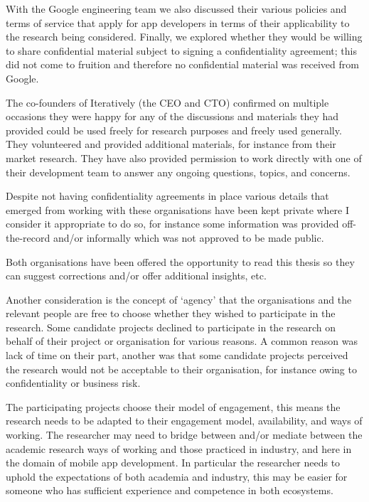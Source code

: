 With the Google engineering team we also discussed their various policies and terms of service that apply for app developers in terms of their applicability to the research being considered. Finally, we explored whether they would be willing to share confidential material subject to signing a confidentiality agreement; this did not come to fruition and therefore no confidential material was received from Google.

The co-founders of Iteratively (the CEO and CTO) confirmed on multiple occasions they were happy for any of the discussions and materials they had provided could be used freely for research purposes and freely used generally. They volunteered and provided additional materials, for instance from their market research. They have also provided permission to work directly with one of their development team to answer any ongoing questions, topics, and concerns.

Despite not having confidentiality agreements in place various details that emerged from working with these organisations have been kept private where I consider it appropriate to do so, for instance some information was provided off-the-record and/or informally which was not approved to be made public. 

Both organisations have been offered the opportunity to read this thesis so they can suggest corrections and/or offer additional insights, etc.


Another consideration is the concept of `agency' that the organisations and the relevant people are free to choose whether they wished to participate in the research. Some candidate projects declined to participate in the research on behalf of their project or organisation for various reasons. A common reason was lack of time on their part, another was that some candidate projects perceived the research would not be acceptable to their organisation, for instance owing to confidentiality or business risk.

The participating projects choose their model of engagement, this means the research needs to be adapted to their engagement model, availability, and ways of working. The researcher may need to bridge between and/or mediate between the academic research ways of working and those practiced in industry, and here in the domain of mobile app development. In particular the researcher needs to uphold the expectations of both academia and industry, this may be easier for someone who has sufficient experience and competence in both ecosystems.


